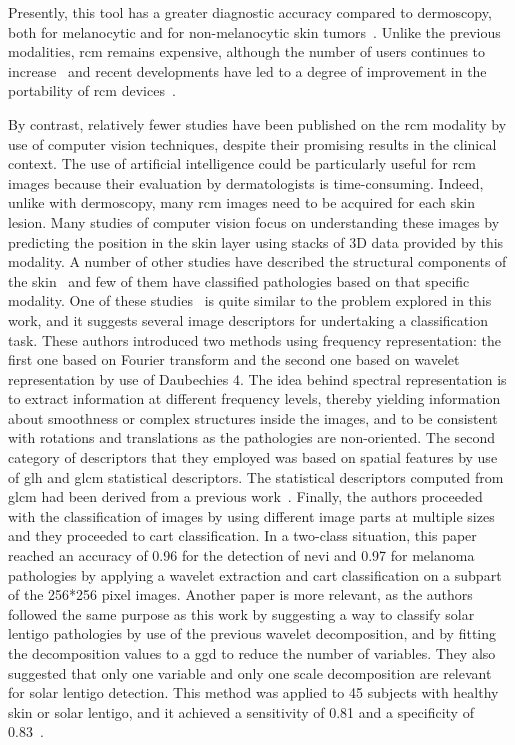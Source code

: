 \documentclass[journal,article,accept,moreauthors,pdftex, applsci]{Definitions/mdpi}
\begin{document}
Presently, this tool has a greater diagnostic accuracy compared to dermoscopy, both for melanocytic and for non-melanocytic skin tumors~\cite{Haroon2017, Dinnes2018, Lupu2019}. Unlike the previous modalities, \ac{rcm} remains expensive, although the number of users continues to increase~\cite{Batta2015} and recent developments have led to a degree of improvement in the portability of \ac{rcm} devices~\cite{Freeman2018}.\par
By contrast, relatively fewer studies have been published on the \ac{rcm} modality by use of computer vision techniques, despite their promising results in the clinical context. The use of artificial intelligence could be particularly useful for \ac{rcm} images because their evaluation by dermatologists is time-consuming. Indeed, unlike with dermoscopy, many \ac{rcm} images need to be acquired for each skin lesion. Many studies of computer vision focus on understanding these images by predicting the position in the skin layer \cite{Somoza2014,Hames2016} using stacks of 3D data provided by this modality. A number of other studies have described the structural components of the skin~\cite{Gareau2010} and few of them have classified pathologies based on that specific modality. One of these studies~\cite{Wiltgen2008} is quite similar to the problem explored in this work, and it suggests several image descriptors for undertaking a classification task. These authors introduced two methods using frequency representation: the first one based on Fourier transform and the second one based on wavelet representation by use of Daubechies 4. The idea behind spectral representation is to extract information at different frequency levels, thereby yielding information about smoothness or complex structures inside the images, and to be consistent with rotations and translations as the pathologies are non-oriented. The second category of descriptors that they employed was based on spatial features by use of \ac{glh} and \ac{glcm} statistical descriptors. The statistical descriptors computed from \ac{glcm} had been derived from a previous work~\cite{Haralick1973}. Finally, the authors proceeded with the classification of images by using different image parts at multiple sizes and they proceeded to \ac{cart} classification. In a two-class situation, this paper reached an accuracy of 0.96 for the detection of nevi and 0.97 for melanoma pathologies by applying a wavelet extraction and \ac{cart} classification on a subpart of the 256*256 pixel images. Another paper is more relevant, as the authors followed the same purpose as this work by suggesting a way to classify solar lentigo pathologies by use of the previous wavelet decomposition, and by fitting the decomposition values to a \ac{ggd} to reduce the number of variables. They also suggested that only one variable and only one scale decomposition are relevant for solar lentigo detection. This method was applied to 45 subjects with healthy skin or solar lentigo, and it achieved a sensitivity of 0.81 and a specificity of 0.83~\cite{Halimi2017a}.\par
\end{document}
